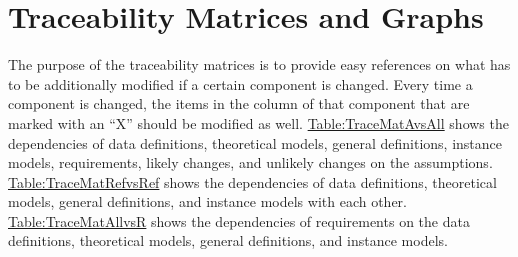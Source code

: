 \documentclass[12pt]{article}
\begin{document}
\section{Traceability Matrices and Graphs}
\label{Sec:TraceMatrices}
The purpose of the traceability matrices is to provide easy references on what has to be additionally modified if a certain component is changed. Every time a component is changed, the items in the column of that component that are marked with an ``X'' should be modified as well. \hyperref[Table:TraceMatAvsAll]{Table:TraceMatAvsAll} shows the dependencies of data definitions, theoretical models, general definitions, instance models, requirements, likely changes, and unlikely changes on the assumptions. \hyperref[Table:TraceMatRefvsRef]{Table:TraceMatRefvsRef} shows the dependencies of data definitions, theoretical models, general definitions, and instance models with each other. \hyperref[Table:TraceMatAllvsR]{Table:TraceMatAllvsR} shows the dependencies of requirements on the data definitions, theoretical models, general definitions, and instance models.
\end{document}

